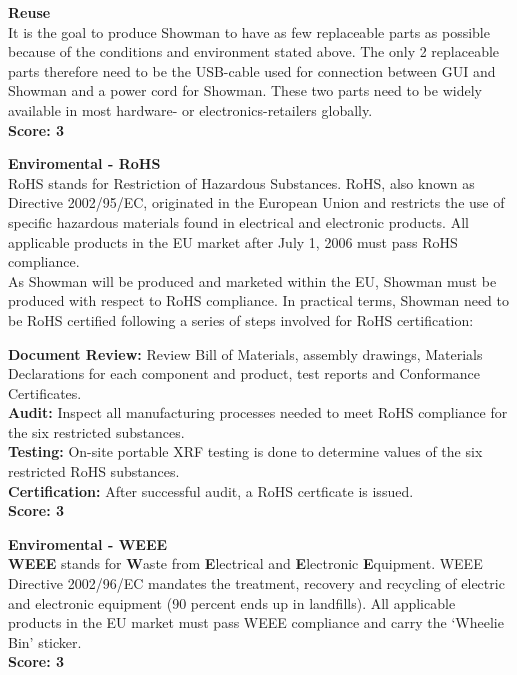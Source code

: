 \textbf{Reuse} \\
It is the goal to produce Showman to have as few replaceable parts as possible because of the conditions and environment stated above. The only 2 replaceable parts therefore need to be the USB-cable used for connection between GUI and Showman and a power cord for Showman. These two parts need to be widely available in most hardware- or electronics-retailers globally. \\
\textbf{Score: 3} \newline

\textbf{Enviromental - RoHS} \\
RoHS stands for Restriction of Hazardous Substances. RoHS, also known as Directive 2002/95/EC, originated in the European Union and restricts the use of specific hazardous materials found in electrical and electronic products. All applicable products in the EU market after July 1, 2006 must pass RoHS compliance. \\
As Showman will be produced and marketed within the EU, Showman must be produced with respect to RoHS compliance. In practical terms, Showman need to be RoHS certified following a series of steps involved for RoHS certification: \newline

\textbf{Document Review:} Review Bill of Materials, assembly drawings, Materials Declarations for each component and product, test reports and Conformance Certificates. \\

\textbf{Audit:} Inspect all manufacturing processes needed to meet RoHS compliance for the six restricted substances. \\

\textbf{Testing:} On-site portable XRF testing is done to determine values of the six restricted RoHS substances. \\

\textbf{Certification:} After successful audit, a RoHS certficate is issued. \\
\textbf{Score: 3} \newline

\textbf{Enviromental - WEEE} \\
\textbf{WEEE} stands for \textbf{W}aste from \textbf{E}lectrical and \textbf{E}lectronic \textbf{E}quipment. WEEE Directive 2002/96/EC mandates the treatment, recovery and recycling of electric and electronic equipment (90 percent ends up in landfills). All applicable products in the EU market must pass WEEE compliance and carry the `Wheelie Bin' sticker. \\
\textbf{Score: 3} \newline

